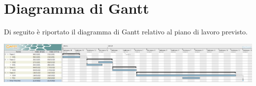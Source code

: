 \section*{Diagramma di Gantt}
Di seguito è riportato il diagramma di Gantt relativo al piano di lavoro previsto.
\begin{center}
	\includegraphics[width=19cm]{img/gantt2.png}
\end{center}